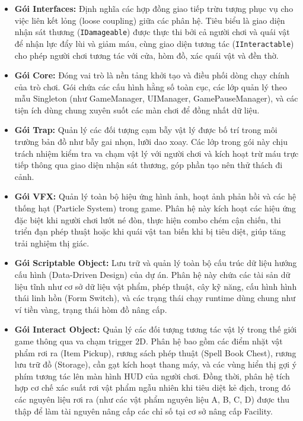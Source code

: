 \documentclass[../DoAn.tex]{subfiles}
\begin{document}
\begin{itemize}
    \item \textbf{Gói Interfaces:} Định nghĩa các hợp đồng giao tiếp trừu tượng phục vụ cho việc liên kết lỏng (loose coupling) giữa các phân hệ. Tiêu biểu là giao diện nhận sát thương (\texttt{IDamageable}) được thực thi bởi cả người chơi và quái vật để nhận lực đẩy lùi và giảm máu, cùng giao diện tương tác (\texttt{IInteractable}) cho phép người chơi tương tác với cửa, hòm đồ, xác quái vật và đền thờ.
    \item \textbf{Gói Core:} Đóng vai trò là nền tảng khởi tạo và điều phối dòng chạy chính của trò chơi. Gói chứa các cấu hình hằng số toàn cục, các lớp quản lý theo mẫu Singleton (như GameManager, UIManager, GamePauseManager), và các tiện ích dùng chung xuyên suốt các màn chơi để đồng nhất dữ liệu.
    \item \textbf{Gói Trap:} Quản lý các đối tượng cạm bẫy vật lý được bố trí trong môi trường bản đồ như bẫy gai nhọn, lưỡi dao xoay. Các lớp trong gói này chịu trách nhiệm kiểm tra va chạm vật lý với người chơi và kích hoạt trừ máu trực tiếp thông qua giao diện nhận sát thương, góp phần tạo nên thử thách đi cảnh.
    \item \textbf{Gói VFX:} Quản lý toàn bộ hiệu ứng hình ảnh, hoạt ảnh phản hồi và các hệ thống hạt (Particle System) trong game. Phân hệ này kích hoạt các hiệu ứng đặc biệt khi người chơi lướt né đòn, thực hiện combo chém cận chiến, thi triển đạn phép thuật hoặc khi quái vật tan biến khi bị tiêu diệt, giúp tăng trải nghiệm thị giác.
    \item \textbf{Gói Scriptable Object:} Lưu trữ và quản lý toàn bộ cấu trúc dữ liệu hướng cấu hình (Data-Driven Design) của dự án. Phân hệ này chứa các tài sản dữ liệu tĩnh như cơ sở dữ liệu vật phẩm, phép thuật, cây kỹ năng, cấu hình hình thái linh hồn (Form Switch), và các trạng thái chạy runtime dùng chung như ví tiền vàng, trạng thái hòm đồ nâng cấp.
    \item \textbf{Gói Interact Object:} Quản lý các đối tượng tương tác vật lý trong thế giới game thông qua va chạm trigger 2D. Phân hệ bao gồm các điểm nhặt vật phẩm rơi ra (Item Pickup), rương sách phép thuật (Spell Book Chest), rương lưu trữ đồ (Storage), cần gạt kích hoạt thang máy, và các vùng hiển thị gợi ý phím tương tác lên màn hình HUD của người chơi. Đồng thời, phân hệ tích hợp cơ chế xác suất rơi vật phẩm ngẫu nhiên khi tiêu diệt kẻ địch, trong đó các nguyên liệu rơi ra (như các vật phẩm nguyên liệu A, B, C, D) được thu thập để làm tài nguyên nâng cấp các chỉ số tại cơ sở nâng cấp Facility.
\end{itemize}
\end{document}
